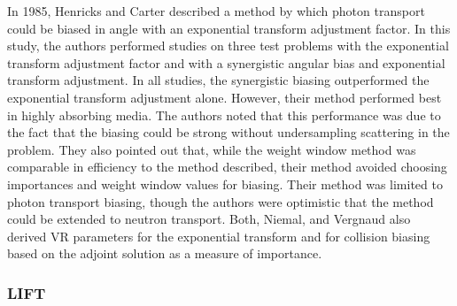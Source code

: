 In 1985, Henricks and Carter \cite{hendricks_anisotropic_1985} described a
method by which
photon transport could be biased in angle with an exponential transform
adjustment factor.
In this study, the authors performed studies on three test problems with the
exponential
transform adjustment factor and with a synergistic angular bias and exponential
transform
adjustment.
In all studies, the synergistic biasing outperformed the exponential transform
adjustment
alone.
However, their method performed best in highly absorbing media.
The authors noted that this performance was due to the fact that the biasing
could be 
strong without undersampling scattering in the problem.
They also pointed out that, while the weight window method was comparable in
efficiency to the
method described, their method avoided choosing importances and
weight window
values for biasing. Their method was limited to photon transport
biasing, though the authors were optimistic that the method could be extended
to neutron
transport.
Both, Niemal, and Vergnaud \cite{both_automated_1990} also derived VR parameters for
the exponential transform and for collision biasing based on the adjoint
solution as a measure of importance. 

\subsubsection{LIFT}
\label{subsec:LIFT}

